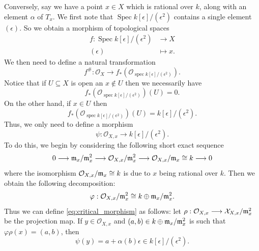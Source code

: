 \documentclass[12pt]{article}
\numberwithin{thm}{subsection}
\numberwithin{defn}{subsection}
\numberwithin{lemma}{subsection}
\numberwithin{example}{subsection}
\numberwithin{notation}{subsection}
\numberwithin{cor}{subsection}
\numberwithin{remark}{subsection}
\numberwithin{condition}{subsection}
\numberwithin{question}{subsection}
\numberwithin{construction}{subsection}
\numberwithin{construction}{subsection}
\numberwithin{construction}{subsection}
\newcommand{\lto}{\longrightarrow}
\begin{document}
Conversely, say we have a point $x \in X$ which is rational over $k$, along with an element $\alpha$ of $T_x$. We first note that $\operatorname{Spec}k[\epsilon]/(\epsilon^2)$ contains a single element $(\epsilon)$. So we obtain a morphism of topological spaces
\begin{align*}
    f: \operatorname{Spec}k[\epsilon]/(\epsilon^2) &\lto X\\
    (\epsilon) &\longmapsto x.
\end{align*}
We then need to define a natural transformation
\begin{equation*}
    f^{\#}: \mathcal{O}_{X} \lto f_\ast(\mathcal{O}_{\operatorname{spec}k[\epsilon]/(\epsilon^2)}).
\end{equation*}
Notice that if $U \subseteq X$ is open an $x \not\in U$ then we necessarily have
\begin{equation*}
    f_\ast(\mathcal{O}_{\operatorname{spec}k[\epsilon]/(\epsilon^2)})(U) = 0.
\end{equation*}
On the other hand, if $x \in U$ then
\begin{equation*}
    f_\ast(\mathcal{O}_{\operatorname{spec}k[\epsilon]/(\epsilon^2)})(U) = k[\epsilon]/(\epsilon^2).
\end{equation*}
Thus, we only need to define a morphism
\begin{equation}
\label{eq:critical_morphism}
    \psi: \mathcal{O}_{X,x} \lto k[\epsilon]/(\epsilon^2).
\end{equation}
To do this, we begin by considering the following short exact sequence
\begin{equation*}
    0\lto \frak{m}_x/\frak{m}_x^2 \lto \mathcal{O}_{X,x}/\frak{m}_x^2 \lto \mathcal{O}_{X,x}/\frak{m}_x \cong k \lto 0
\end{equation*}
where the isomorphism $\mathcal{O}_{X,x}/\frak{m}_x \cong k$ is due to $x$ being rational over $k$. Then we obtain the following decomposition:
\begin{equation*}
    \varphi: \mathcal{O}_{X,x}/\frak{m}_x^2 \cong k \oplus \frak{m}_x/\frak{m}_{x}^2.
\end{equation*}
Thus we can define \eqref{eq:critical_morphism} as follows: let $\rho: \mathcal{O}_{X,x} \lto \mathcal{X}_{X,x}/\frak{m}_x^2$ be the projection map. If $y \in \mathcal{O}_{X,x}$ and $(a,b) \in k \oplus \frak{m}_x/\frak{m}_x^2$ is such that $\varphi \rho (x) = (a,b)$, then
\begin{equation*}
    \psi(y) = a + \alpha(b)\epsilon \in k[\epsilon]/(\epsilon^2).
\end{equation*}
\end{document}
